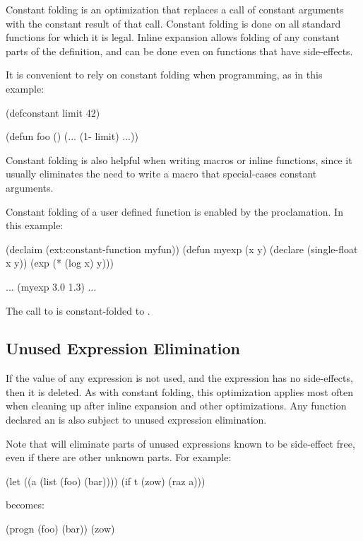 Constant folding is an optimization that replaces a call of constant
arguments with the constant result of that call.  Constant folding is
done on all standard functions for which it is legal.  Inline
expansion allows folding of any constant parts of the definition, and
can be done even on functions that have side-effects.

It is convenient to rely on constant folding when programming, as in this
example:
\begin{example}
(defconstant limit 42)

(defun foo ()
  (... (1- limit) ...))
\end{example}
Constant folding is also helpful when writing macros or inline
functions, since it usually eliminates the need to write a macro that
special-cases constant arguments.

 Constant folding of a user
defined function is enabled by the 
proclamation.  In this example:
\begin{example}
(declaim (ext:constant-function myfun))
(defun myexp (x y)
  (declare (single-float x y))
  (exp (* (log x) y)))

 ... (myexp 3.0 1.3) ...
\end{example}
The call to  is constant-folded to .


\subsection{Unused Expression Elimination}

If the value of any expression is not used, and the expression has no
side-effects, then it is deleted.  As with constant folding, this
optimization applies most often when cleaning up after inline
expansion and other optimizations.  Any function declared an
 is also subject to unused
expression elimination.

Note that \python{} will eliminate parts of unused expressions known
to be side-effect free, even if there are other unknown parts.  For
example:
\begin{lisp}
(let ((a (list (foo) (bar))))
  (if t
      (zow)
      (raz a)))
\end{lisp}
becomes:
\begin{lisp}
(progn (foo) (bar))
(zow)
\end{lisp}


